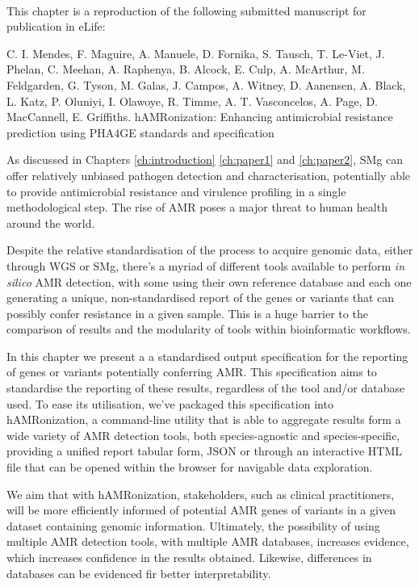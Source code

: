 \mbox{}\\
\vspace{8cm}


This chapter is a reproduction of the following submitted manuscript for publication in eLife:

C. I. Mendes, F. Maguire, A. Manuele, D. Fornika, S. Tausch, T. Le-Viet, J. Phelan, C. Meehan, A. Raphenya, B. Alcock, E. Culp, A. McArthur, M. Feldgarden, G. Tyson, M. Galas, J. Campos, A. Witney, D. Aanensen, A. Black, L. Katz, P. Oluniyi, I. Olawoye, R. Timme, A. T. Vasconcelos, A. Page, D. MacCannell, E. Griffiths. 
hAMRonization: Enhancing antimicrobial resistance prediction using PHA4GE standards and specification

As discussed in Chapters \ref{ch:introduction} \ref{ch:paper1} and \ref{ch:paper2}, \ac{SMg} can offer relatively unbiased pathogen detection and characterisation, potentially able to provide antimicrobial resistance and virulence profiling in a single methodological step. The rise of \ac{AMR} poses a major threat to human health around the world.

Despite the relative standardisation of the process to acquire genomic data, either through \ac{WGS} or \ac{SMg}, there's a myriad of different tools available to perform \textit{in silico} \ac{AMR} detection, with some using their own reference database and each one generating a unique, non-standardised report of the genes or variants that can possibly confer resistance in a given sample. This is a huge barrier to the comparison
of results and the modularity of tools within bioinformatic workflows.

In this chapter we present a a standardised output specification for the reporting of genes or variants potentially conferring \ac{AMR}. This specification aims to standardise the reporting of these results, regardless of the tool and/or database used. To ease its utilisation, we've packaged this specification into hAMRonization, a command-line utility that is able to aggregate results form a wide variety of \ac{AMR} detection tools, both species-agnostic and species-specific, providing a unified report tabular form, JSON or through an interactive HTML file that can be opened within the browser for navigable data exploration. 

We aim that with hAMRonization, stakeholders, such as clinical practitioners, will be more efficiently informed of potential \ac{AMR} genes of variants in a given dataset containing genomic information. Ultimately, the possibility of using multiple \ac{AMR} detection tools, with multiple \ac{AMR} databases, increases evidence, which increases confidence in the results obtained. Likewise, differences in databases can be evidenced fir better interpretability. 

